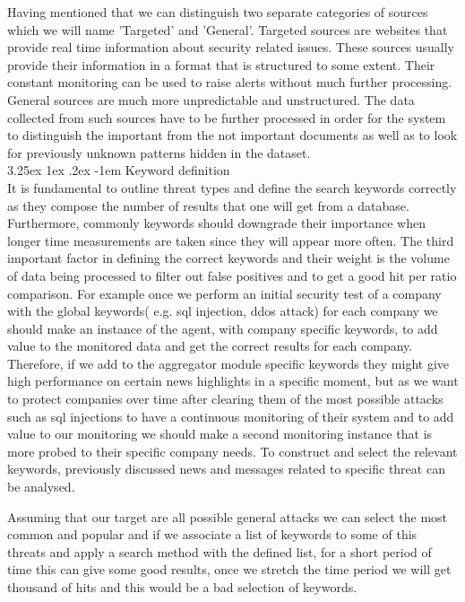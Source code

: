 \documentclass[12pt]{article}
\makeatletter
\renewcommand\paragraph{\@startsection{paragraph}{5}{\z@}%
  {3.25ex \@plus1ex \@minus.2ex}%
  {-1em}%
  {\normalfont\normalsize\bfseries}}
\makeatother
\begin{document}
Having mentioned that we can distinguish two separate categories of sources which we will name 'Targeted' and 'General'. Targeted sources are websites that provide real time information about security related issues. These sources usually provide their information in a format that is structured to some extent. Their constant monitoring can be used to raise alerts without much further processing.\\
General sources are much more unpredictable and unstructured. The data collected from such sources have to be further processed in order for the system to distinguish the important from the not important documents as well as to look for previously unknown patterns hidden in the dataset. \\

\paragraph{Keyword definition}
\hfill \break \\
It is fundamental to outline threat types and define the search keywords correctly as they compose the number of results that one will get from a database. Furthermore, commonly keywords should downgrade their importance when longer time measurements are taken since they will appear more often. The third important factor in defining the correct keywords and their weight is the volume of data being processed to filter out false positives and to get a good hit per ratio comparison. For example once we perform an initial security test of a company with the global keywords( e.g. sql injection, ddos attack) for each company we should make an instance of the agent, with company specific keywords, to add value to the monitored data and get the correct results for each company. Therefore, if we add to the aggregator module specific keywords they might give high performance on certain news highlights in a specific moment, but as we want to protect companies over time after clearing them of the most possible attacks such as sql injections to have a continuous monitoring of their system and to add value to our monitoring we should make a second monitoring instance that is more probed to their specific company needs. To construct and select the relevant keywords, previously discussed news \cite{list-2015-attacks} and messages related to specific threat can be analysed. 

Assuming that our target are all possible general attacks we can select the most common and popular \cite{owasp} and if we associate a list of keywords to some of this threats and apply a search method with the defined list, for a short period of time this can give some good results, once we stretch the time period we will get thousand of hits and this would be a bad selection of keywords.\\
\end{document}
